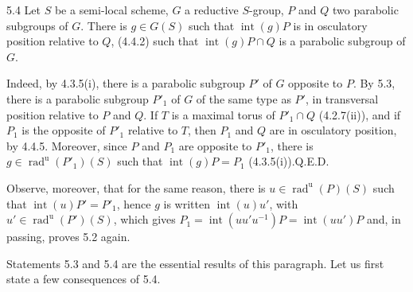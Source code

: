 \begin{corollary}{5.4}\label{XXVI.5.4}
Let $S$ be a semi-local scheme, $G$ a reductive $S$-group, $P$ and $Q$ two parabolic subgroups of $G$. There is $g\in G(S)$ such that $\operatorname{int}(g)P$ is in osculatory position relative to $Q$, \ie (4.4.2) such that $\operatorname{int}(g)P\cap Q$ is a parabolic subgroup of $G$.
\end{corollary}
Indeed, by 4.3.5(i), there is a parabolic subgroup $P'$ of $G$ opposite to $P$. By 5.3, there is a parabolic subgroup $P'_1$ of $G$ of the same type as $P'$, in transversal position relative to $P$ and $Q$. If $T$ is a maximal torus of $P'_1\cap Q$ (4.2.7(ii)), and if $P_1$ is the opposite of $P'_1$ relative to $T$, then $P_1$ and $Q$ are in osculatory position, by 4.4.5. Moreover, since $P$ and $P_1$ are opposite to $P'_1$, there is $g\in\operatorname{rad}^{\mathrm u}(P'_1)(S)$ such that $\operatorname{int}(g)P=P_1$ (4.3.5(i)).\hfill Q.E.D.

Observe, moreover, that for the same reason, there is $u\in\operatorname{rad}^{\mathrm u}(P)(S)$ such that $\operatorname{int}(u)P'=P'_1$, hence $g$ is written $\operatorname{int}(u)u'$, with $u'\in\operatorname{rad}^{\mathrm u}(P')(S)$, which gives $P_1=\operatorname{int}(uu'u^{-1})P=\operatorname{int}(uu')P$ and, in passing, proves 5.2 again.

Statements 5.3 and 5.4 are the essential results of this paragraph. Let us first state a few consequences of 5.4.

